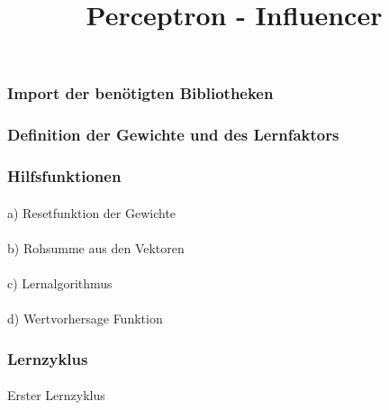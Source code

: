 \documentclass[
  11pt,
  a4paper,
  DIV=11,
  numbers=noendperiod]{scrartcl}
\title{Perceptron - Influencer}
\author{}
\date{}
\makeatletter
\let\oldparagraph\paragraph
\renewcommand{\paragraph}{
    \@ifstar
      \xxxParagraphStar
      \xxxParagraphNoStar
  }
\newcommand{\xxxParagraphStar}[1]{\oldparagraph*{#1}\mbox{}}
\newcommand{\xxxParagraphNoStar}[1]{\oldparagraph{#1}\mbox{}}
\makeatother
\begin{document}
\maketitle


\subsubsection{Import der benötigten
Bibliotheken}\label{import-der-benuxf6tigten-bibliotheken}

\subsubsection{Definition der Gewichte und des
Lernfaktors}\label{definition-der-gewichte-und-des-lernfaktors}

\subsubsection{Hilfsfunktionen}\label{hilfsfunktionen}

\paragraph{a) Resetfunktion der
Gewichte}\label{a-resetfunktion-der-gewichte}

\paragraph{b) Rohsumme aus den
Vektoren}\label{b-rohsumme-aus-den-vektoren}

\paragraph{c) Lernalgorithmus}\label{c-lernalgorithmus}

\paragraph{d) Wertvorhersage Funktion}\label{d-wertvorhersage-funktion}

\subsubsection{Lernzyklus}\label{lernzyklus}

\paragraph{Erster Lernzyklus}\label{erster-lernzyklus}
\end{document}
